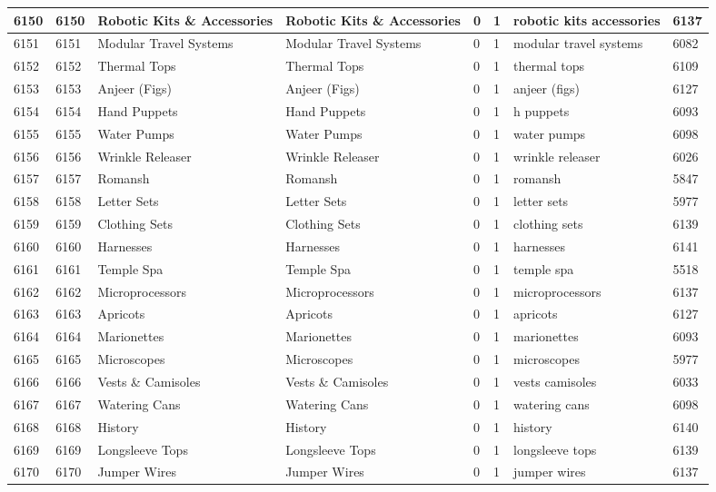 \begin{longtable}{|l|l|l|l|l|l|l|l|}
6150 & 6150 & Robotic Kits \& Accessories & Robotic Kits \& Accessories & 0 & 1 & robotic kits accessories & 6137 \\ \hline 
6151 & 6151 & Modular Travel Systems & Modular Travel Systems & 0 & 1 & modular travel systems & 6082 \\ \hline 
6152 & 6152 & Thermal Tops & Thermal Tops & 0 & 1 & thermal tops & 6109 \\ \hline 
6153 & 6153 & Anjeer (Figs) & Anjeer (Figs) & 0 & 1 & anjeer (figs) & 6127 \\ \hline 
6154 & 6154 & Hand Puppets & Hand Puppets & 0 & 1 & h puppets & 6093 \\ \hline 
6155 & 6155 & Water Pumps & Water Pumps & 0 & 1 & water pumps & 6098 \\ \hline 
6156 & 6156 & Wrinkle Releaser & Wrinkle Releaser & 0 & 1 & wrinkle releaser & 6026 \\ \hline 
6157 & 6157 & Romansh & Romansh & 0 & 1 & romansh & 5847 \\ \hline 
6158 & 6158 & Letter Sets & Letter Sets & 0 & 1 & letter sets & 5977 \\ \hline 
6159 & 6159 & Clothing Sets & Clothing Sets & 0 & 1 & clothing sets & 6139 \\ \hline 
6160 & 6160 & Harnesses & Harnesses & 0 & 1 & harnesses & 6141 \\ \hline 
6161 & 6161 & Temple Spa & Temple Spa & 0 & 1 & temple spa & 5518 \\ \hline 
6162 & 6162 & Microprocessors & Microprocessors & 0 & 1 & microprocessors & 6137 \\ \hline 
6163 & 6163 & Apricots & Apricots & 0 & 1 & apricots & 6127 \\ \hline 
6164 & 6164 & Marionettes & Marionettes & 0 & 1 & marionettes & 6093 \\ \hline 
6165 & 6165 & Microscopes & Microscopes & 0 & 1 & microscopes & 5977 \\ \hline 
6166 & 6166 & Vests \& Camisoles & Vests \& Camisoles & 0 & 1 & vests camisoles & 6033 \\ \hline 
6167 & 6167 & Watering Cans & Watering Cans & 0 & 1 & watering cans & 6098 \\ \hline 
6168 & 6168 & History & History & 0 & 1 & history & 6140 \\ \hline 
6169 & 6169 & Longsleeve Tops & Longsleeve Tops & 0 & 1 & longsleeve tops & 6139 \\ \hline 
6170 & 6170 & Jumper Wires & Jumper Wires & 0 & 1 & jumper wires & 6137 \\ \hline 

\end{longtable}
